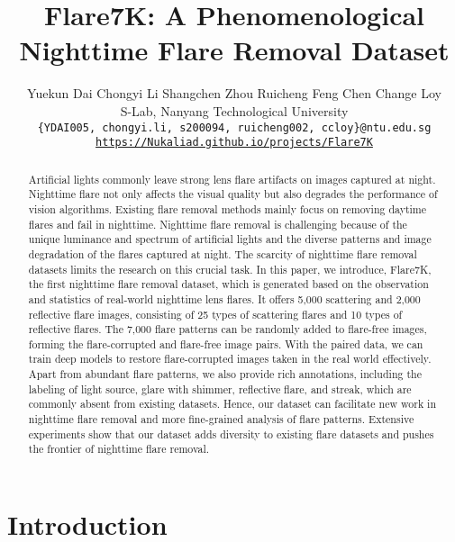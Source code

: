 \documentclass{article}
\title{Flare7K: A Phenomenological Nighttime Flare Removal Dataset}
\author{
Yuekun Dai Chongyi Li  Shangchen Zhou Ruicheng Feng  Chen Change Loy \\
S-Lab, Nanyang Technological University \\
\texttt{\small \{YDAI005, chongyi.li, s200094, ruicheng002, ccloy\}@ntu.edu.sg}\\ \vspace{2mm}
{\tt\small \url{https://Nukaliad.github.io/projects/Flare7K}}
}
\newcommand{\N}{Flare7K}
\begin{document}
\maketitle


\vspace{-7mm}
\begin{abstract}
\vspace{-4mm}
Artificial lights commonly leave strong lens flare artifacts on images captured at night. 
Nighttime flare not only affects the visual quality but also degrades the performance of vision algorithms. 
Existing flare removal methods mainly focus on removing daytime flares and fail in nighttime.
Nighttime flare removal is challenging because of the unique luminance and spectrum of artificial lights and the diverse patterns and image degradation of the flares captured at night.
The scarcity of nighttime flare removal datasets limits the research on this crucial task.  
In this paper, we introduce, \N, the first nighttime flare removal dataset, which is generated based on the observation and statistics of real-world nighttime lens flares.
It offers 5,000 scattering and 2,000 reflective flare images, consisting of 25 types of scattering flares and 10 types of reflective flares. 
The 7,000 flare patterns can be randomly added to flare-free images, forming the flare-corrupted and flare-free image pairs. 
With the paired data, we can train deep models to restore flare-corrupted images taken in the real world effectively.
Apart from abundant flare patterns, we also provide rich annotations, including the labeling of light source, glare with shimmer, reflective flare, and streak, which are commonly absent from existing datasets.
Hence, our dataset can facilitate new work in nighttime flare removal and more fine-grained analysis of flare patterns. 
Extensive experiments show that our dataset adds diversity to existing flare datasets and pushes the frontier of nighttime flare removal. 


\end{abstract}

\vspace{-5mm}
\section{Introduction}
\vspace{-4mm}
\end{document}
